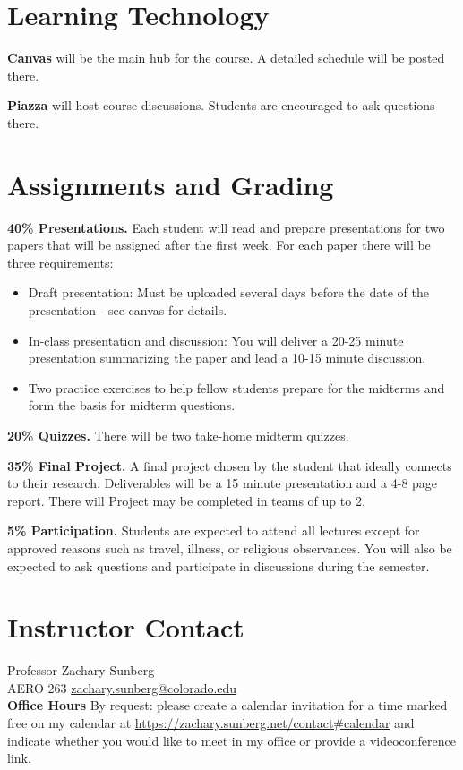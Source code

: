 \documentclass[9pt]{article}
\begin{document}
\section*{Learning Technology}

\textbf{Canvas} will be the main hub for the course. A detailed schedule will be posted there.

\textbf{Piazza} will host course discussions. Students are encouraged to ask questions there.

\section*{Assignments and Grading}

\textbf{40\% Presentations.}
Each student will read and prepare presentations for two papers that will be assigned after the first week. For each paper there will be three requirements:
\begin{itemize}[nosep]
    \item Draft presentation: Must be uploaded several days before the date of the presentation - see canvas for details.
    \item In-class presentation and discussion: You will deliver a 20-25 minute presentation summarizing the paper and lead a 10-15 minute discussion.
    \item Two practice exercises to help fellow students prepare for the midterms and form the basis for midterm questions.
\end{itemize}

\textbf{20\% Quizzes.}
There will be two take-home midterm quizzes.

\textbf{35\% Final Project.}
A final project chosen by the student that ideally connects to their research. Deliverables will be a 15 minute presentation and a 4-8 page report. There will Project may be completed in teams of up to 2.

\textbf{5\% Participation.}
Students are expected to attend all lectures except for approved reasons such as travel, illness, or religious observances. You will also be expected to ask questions and participate in discussions during the semester.

\section*{Instructor Contact}

Professor Zachary Sunberg\\
AERO 263 \href{mailto://zachary.sunberg@colorado.edu}{zachary.sunberg@colorado.edu}\\
\textbf{Office Hours}
By request: please create a calendar invitation for a time marked free on my calendar at \url{ https://zachary.sunberg.net/contact#calendar} and indicate whether you would like to meet in my office or provide a videoconference link. \\
\end{document}
